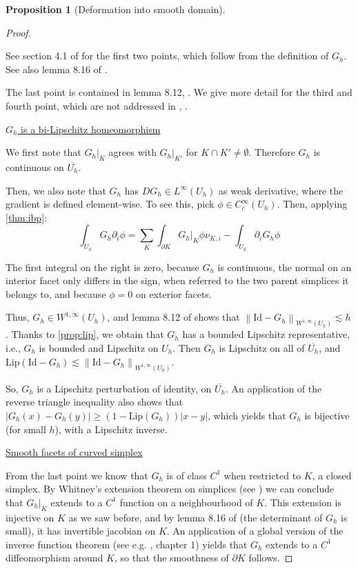 \documentclass[english,a4paper,10pt,oneside]{scrbook}	%
\theoremstyle{break}
\newtheorem{prop}[equation]{Proposition}
\newenvironment{mproof}[1][\proofname]{%
  \begin{proof}[#1]$ $\par\nobreak\ignorespaces
}{%
  \end{proof}
}
\renewcommand*{\proofname}{Proof}
\theoremstyle{remark}
\newcommand{\norm}[1]{\left\lVert#1\right\rVert}
\newcommand{\id}{\text{Id}}
\begin{document}
\begin{appendices}
\begin{prop}[Deformation into smooth domain]
\end{prop}
\begin{mproof}

See section 4.1 of \cite{elliott} for the first two points, which follow from the definition of $G_h$. See also lemma 8.16 of \cite{ranner}.

The last point is contained in lemma 8.12, \cite{ranner}. We give more detail for the third and fourth point, which are not addressed in \cite{ranner}, \cite{elliott}.

\underline{$G_h$ is a bi-Lipschitz homeomorphism}

We first note that $G_h|_K$ agrees with $G_h|_{K'}$ for $K\cap K' \neq \emptyset$. Therefore $G_h$ is continuous on $\overline{U_h}$.

Then, we also note that $G_h$ has $DG_h \in L^\infty(U_h)$ as weak derivative, where the gradient is defined element-wise. To see this, pick $\phi \in C^\infty_c(U_h)$.
Then, applying \cref{thm:ibp}:
$$\int_{U_h} G_h \partial_i \phi = \sum_K \int_{\partial K}G_h|_{K} \phi \nu_{K,i}  - \int_{U_h}\partial_i G_h \phi$$

The first integral on the right is zero, because $G_h$ is continuous, the normal on an interior facet only differs in the sign, when referred to the two parent simplices it belongs to, and because $\phi=0$ on exterior facets.

Thus, $G_h \in W^{1,\infty}(U_h)$, and lemma 8.12 of \cite{ranner} shows that $\norm{\id -G_h}_{W^{1,\infty}(U_h)}\lesssim h$. Thanks to \cref{prop:lip}, we obtain that $G_h$ has a bounded Lipschitz representative, i.e., $G_h$ is bounded and Lipschitz on $U_h$. Then $G_h$ is Lipschitz on all of $\overline{U_h}$, and $\text{Lip}(\id -G_h) \lesssim  \norm{\id -G_h}_{W^{1,\infty}(U_h)}$.

So, $G_h$ is a Lipschitz perturbation of identity, on $\overline{U_h}$.  An application of the reverse triangle inequality also shows that $|G_h(x)-G_h(y)|\geq (1-\text{Lip}(G_h))|x-y|$, which yields that $G_h$ is bijective (for small $h$), with a Lipschitz inverse.



\underline{Smooth facets of curved simplex}

From the last point we know that $G_h$ is of class $C^1$ when restricted to $K$, a closed simplex. By Whitney's extension theorem on simplices (see \cite{whitney}) we can conclude that $G_h|_K$ extends to a $C^1$ function on a neighbourhood of $K$. This extension is injective on $K$ as we saw before, and by lemma 8.16 of \cite{ranner} (the determinant of $G_h$ is small), it has invertible jacobian on $K$. An application of a global version of the inverse function theorem (see e.g. \cite{pollack}, chapter 1) yields that $G_h$ extends to a $C^1$ diffeomorphism around $K$, so that the smoothness of $\partial K$ follows.
\end{mproof}


\end{appendices}
\end{document}
